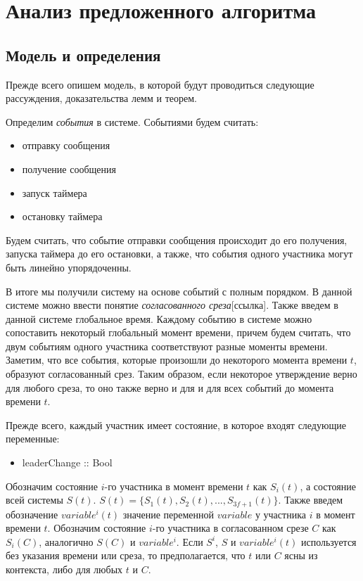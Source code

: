 
\chapter{Анализ предложенного алгоритма}  \label{chapter3}

\section{Модель и определения}
Прежде всего опишем модель, в которой будут проводиться следующие рассуждения, доказательства лемм и теорем.

Определим \textit{события} в системе. Событиями будем считать:
\begin{itemize}
\item отправку сообщения
\item получение сообщения
\item запуск таймера
\item остановку таймера
\end{itemize}

Будем считать, что событие отправки сообщения происходит до его получения, запуска таймера до его остановки, а также, что события одного участника могут быть линейно упорядоченны.

В итоге мы получили систему на основе событий с полным порядком. В данной системе можно ввести понятие \textit{согласованного среза}[ссылка]. Также введем в данной системе глобальное время. Каждому событию в системе можно сопоставить некоторый глобальный момент времени, причем будем считать, что двум событиям одного участника соответствуют разные моменты времени. Заметим, что все события, которые произошли до некоторого момента времени $t$, образуют согласованный срез. Таким образом, если некоторое утверждение верно для любого среза, то оно также верно и для и для всех событий до момента времени $t$.

Прежде всего, каждый участник имеет состояние, в которое входят следующие переменные:
\begin{itemize}
\item leaderChange :: Bool
\end{itemize}

Обозначим состояние $i$-го участника в момент времени $t$ как $S_i(t)$, а состояние всей системы $S(t)$. 
$S(t)=\{S_1(t), S_2(t),..., S_{3f+1}(t)\}$. Также введем обозначение $variable^i(t)$ значение переменной $variable$ у участника $i$ в момент времени $t$.
Обозначим состояние $i$-го участника в согласованном срезе $C$ как $S_i(C)$, аналогично $S(C)$ и $variable^i$.
Если $S^i$, $S$ и $variable^i(t)$ используется без указания времени или среза, то предполагается, что $t$ или $C$ ясны из контекста, либо для любых $t$ и $C$.

